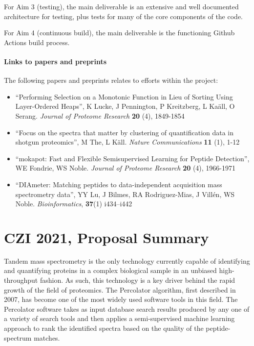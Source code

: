 \documentclass{article}
\begin{document}
For Aim 3 (testing), the main deliverable is an extensive and well
documented architecture for testing, plus tests for many of the core
components of the code.

For Aim 4 (continuous build), the main deliverable is the functioning
Github Actions build process.

\paragraph{Links to papers and preprints}
The following papers and preprints relates to efforts within the project:

\begin{itemize}
  \item ``Performing Selection on a Monotonic Function in Lieu of Sorting Using Layer-Ordered Heaps'',
  K Lucke, J Pennington, P Kreitzberg, L Ka\"{a}ll, O Serang.
  {\em Journal of Proteome Research} {\bf 20} (4), 1849-1854
  \item ``Focus on the spectra that matter by clustering of quantification data in shotgun proteomics'',
  M The, L K\"{a}ll.
  {\em Nature Communications} {\bf 11} (1), 1-12
  \item ``mokapot: Fast and Flexible Semisupervised Learning for Peptide Detection'',
  WE Fondrie, WS Noble.
  {\em Journal of Proteome Research} {\bf 20} (4), 1966-1971
  \item ``DIAmeter: Matching peptides to data-independent acquisition mass spectrometry data'',
  YY Lu, J Bilmes, RA Rodriguez-Mias, J Vill\'en, WS Noble. {\em Bioinformatics}, {\bf 37}(1) i434–i442
\end{itemize}

\section*{ CZI 2021, Proposal Summary}

Tandem mass spectrometry is the only technology currently capable of
identifying and quantifying proteins in a complex biological sample in
an unbiased high-throughput fashion. As such, this technology is a key
driver behind the rapid growth of the field of proteomics. The
Percolator algorithm, first described in 2007, has become one of the
most widely used software tools in this field. The Percolator software
takes as input database search results produced by any one of a
variety of search tools and then applies a semi-supervised machine
learning approach to rank the identified spectra based on the quality
of the peptide-spectrum matches.
\end{document}
